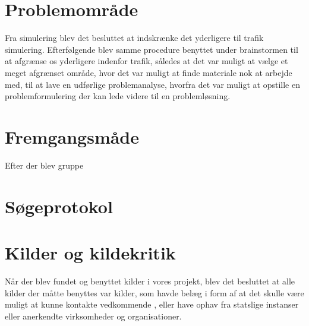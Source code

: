 \section{Problemområde}

Fra simulering blev det besluttet at indskrænke det yderligere til trafik simulering. Efterfølgende blev samme procedure benyttet under brainstormen til at afgrænse os yderligere indenfor trafik, således at det var muligt at vælge et meget afgrænset område, hvor det var muligt at finde materiale nok at arbejde med, til at lave en udførlige problemanalyse, hvorfra det var muligt at opstille en problemformulering der kan lede videre til en problemløsning. 

\section{Fremgangsmåde}

Efter der blev gruppe

\section{Søgeprotokol}

\section{Kilder og kildekritik}

Når der blev fundet og benyttet kilder i vores projekt, blev det besluttet at alle kilder der måtte benyttes var kilder, som havde belæg i form af at det skulle være muligt at kunne kontakte vedkommende , eller have ophav fra statslige instanser eller anerkendte virksomheder og organisationer. 